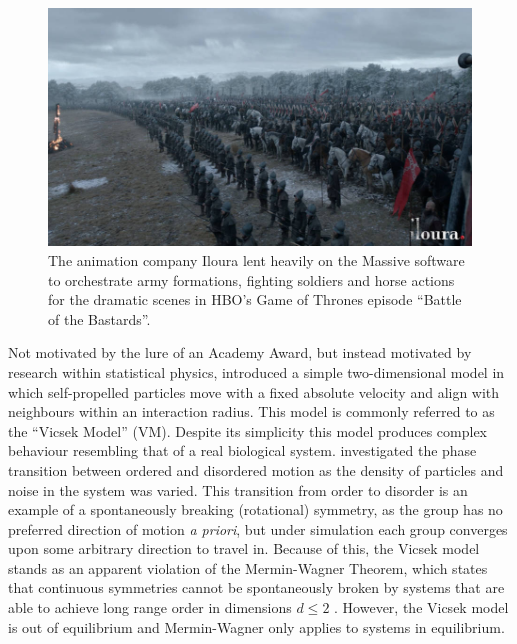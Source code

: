 \begin{figure}[tb]
  \includegraphics[width=\textwidth]{GOT.jpg}
  \caption{The animation company Iloura lent heavily on the Massive software to
    orchestrate army formations, fighting soldiers and horse actions for the
    dramatic scenes in HBO's Game of Thrones episode ``Battle of the
    Bastards''.}
  \label{fig:got}
\end{figure}

Not motivated by the lure of an Academy Award, but instead motivated by
research within statistical physics, \textcite{vicsek95} introduced a simple
two-dimensional model in which self-propelled particles move with a fixed
absolute velocity and align with neighbours within an interaction radius. This
model is commonly referred to as the ``Vicsek Model'' (VM). Despite its
simplicity this model produces complex behaviour resembling that of a real
biological system. \textcite{vicsek95} investigated the phase transition
between ordered and disordered motion as the density of particles and noise in
the system was varied. This transition from order to disorder is an example of
a spontaneously breaking (rotational) symmetry, as the group has no preferred
direction of motion \emph{a priori}, but under simulation each group converges
upon some arbitrary direction to travel in. Because of this, the Vicsek model
stands as an apparent violation of the Mermin-Wagner Theorem, which states that
continuous symmetries cannot be spontaneously broken by systems that are able
to achieve long range order in dimensions $d\leq 2$ \parencite{mermin66}.
However, the Vicsek model is out of equilibrium and Mermin-Wagner only applies
to systems in equilibrium.

